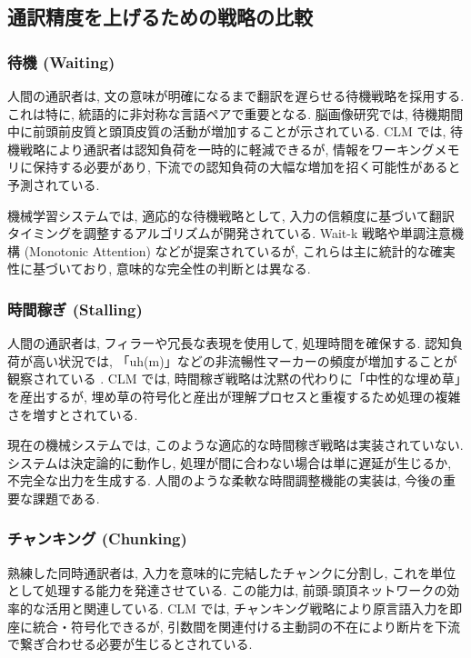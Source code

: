 \subsection{通訳精度を上げるための戦略の比較}

\subsubsection{待機 (Waiting)}

人間の通訳者は, 文の意味が明確になるまで翻訳を遅らせる待機戦略を採用する.
これは特に, 統語的に非対称な言語ペアで重要となる.
脳画像研究では, 待機期間中に前頭前皮質と頭頂皮質の活動が増加することが示されている.
CLM では, 待機戦略により通訳者は認知負荷を一時的に軽減できるが, 情報をワーキングメモリに保持する必要があり, 下流での認知負荷の大幅な増加を招く可能性があると予測されている.

機械学習システムでは, 適応的な待機戦略として, 入力の信頼度に基づいて翻訳タイミングを調整するアルゴリズムが開発されている.
Wait-k 戦略や単調注意機構 (Monotonic Attention) \cite{papi2023attention} などが提案されているが, これらは主に統計的な確実性に基づいており, 意味的な完全性の判断とは異なる.

\subsubsection{時間稼ぎ (Stalling)}

人間の通訳者は, フィラーや冗長な表現を使用して, 処理時間を確保する.
認知負荷が高い状況では, 「uh(m)」などの非流暢性マーカーの頻度が増加することが観察されている \cite{plevoets2018cognitive} .
CLM では, 時間稼ぎ戦略は沈黙の代わりに「中性的な埋め草」を産出するが, 埋め草の符号化と産出が理解プロセスと重複するため処理の複雑さを増すとされている.

現在の機械システムでは, このような適応的な時間稼ぎ戦略は実装されていない.
システムは決定論的に動作し, 処理が間に合わない場合は単に遅延が生じるか, 不完全な出力を生成する.
人間のような柔軟な時間調整機能の実装は, 今後の重要な課題である.

\subsubsection{チャンキング (Chunking)}

熟練した同時通訳者は, 入力を意味的に完結したチャンクに分割し, これを単位として処理する能力を発達させている.
この能力は, 前頭-頭頂ネットワークの効率的な活用と関連している.
CLM では, チャンキング戦略により原言語入力を即座に統合・符号化できるが, 引数間を関連付ける主動詞の不在により断片を下流で繋ぎ合わせる必要が生じるとされている.

